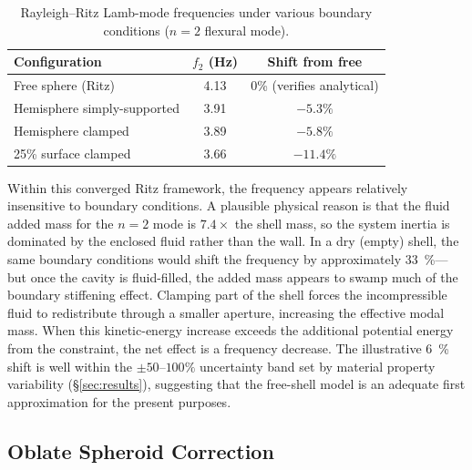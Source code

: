\begin{table}[htbp]
  \centering
  \caption{Rayleigh--Ritz Lamb-mode frequencies under various boundary
  conditions ($n=2$ flexural mode).}
  \label{tab:bc_results}
  \begin{tabular}{lcc}
    \toprule
    Configuration & $f_2$ (Hz) & Shift from free \\
    \midrule
    Free sphere (Ritz) & 4.13 & 0\% (verifies analytical) \\
    Hemisphere simply-supported & 3.91 & $-5.3\%$ \\
    Hemisphere clamped & 3.89 & $-5.8\%$ \\
    25\% surface clamped & 3.66 & $-11.4\%$ \\
    \bottomrule
  \end{tabular}
\end{table}

Within this converged Ritz framework, the frequency appears relatively
insensitive to boundary conditions.  A plausible physical reason is
that the fluid added mass for the $n=2$ mode is $7.4\times$ the shell mass, so
the system inertia is dominated by the enclosed fluid rather than the wall.  In
a dry (empty) shell, the same boundary conditions would shift the frequency by
approximately \SI{33}{\percent}---but once the cavity is fluid-filled, the
added mass appears to swamp much of the boundary stiffening effect.
Clamping part of the shell forces the incompressible fluid to redistribute
through a smaller aperture, increasing the effective modal mass.  When this
kinetic-energy increase exceeds the additional potential energy from the
constraint, the net effect is a frequency decrease.  The illustrative
\SI{6}{\percent} shift
is well within the $\pm 50$--$100\%$ uncertainty band set by material property
variability (\S\ref{sec:results}), suggesting that the free-shell model is an
adequate first approximation for the present purposes.

\subsection{Oblate Spheroid Correction}

